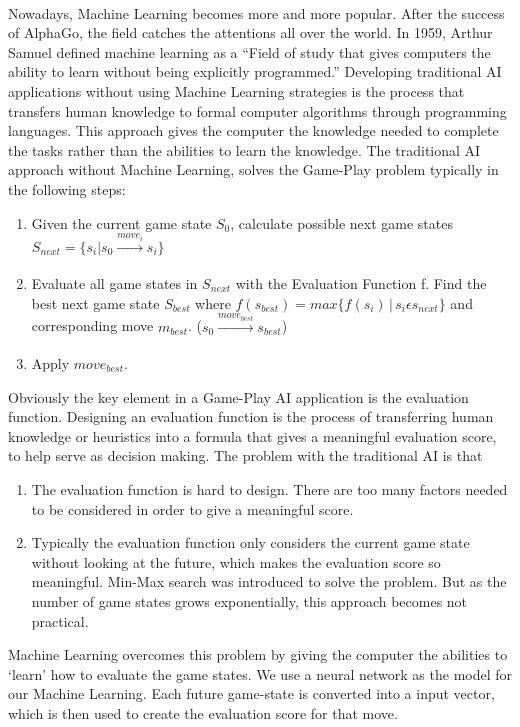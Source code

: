 \documentclass{report}
\begin{document}
	\\
		Nowadays, Machine Learning becomes more and more popular. After the success of AlphaGo, the field catches the attentions all over the world.  In 1959, Arthur Samuel defined machine
		learning as a ``Field of study that gives computers the ability to learn without being explicitly programmed.'' Developing traditional AI applications without using Machine Learning
		strategies is the process that transfers human knowledge to formal computer algorithms through programming languages. This approach gives the computer the knowledge needed
		to complete the tasks rather than the abilities to learn the knowledge. The traditional AI approach without Machine Learning, solves the Game-Play problem typically in the following steps:
		\begin{enumerate}
			\item Given the current game state $S_0$, calculate possible next game states $S_{next} = \{s_i|s_0\xrightarrow[]{move_i}s_i\}$

			\item Evaluate all game states in $S_{next}$ with the Evaluation Function f. Find the best next game state $S_{best}$ where $f(s_{best}) = max\{f(s_i)\,|\,s_i \epsilon s_{next}\}$ and corresponding
				move $m_{best}$. ($s_0 \xrightarrow[]{move_{best}} s_{best}$)
			\item Apply $move_{best}$.
		\end{enumerate}
		Obviously the key element in a Game-Play AI application is the evaluation function. Designing an evaluation function is the process of transferring human knowledge or heuristics into a formula
		that gives a meaningful evaluation score, to help serve as decision making. The problem with the traditional AI is that
		\begin{enumerate}
			\item The evaluation function is hard to design. There are too many factors needed to be considered in order to give a meaningful score. 
			\item Typically the evaluation function only considers the current game state without looking at the future, which makes the evaluation score so meaningful.  Min-Max search was
				introduced to solve the problem. But as the number of game states grows exponentially, this approach becomes not practical.
		\end{enumerate}
		Machine Learning overcomes this problem by giving the computer the abilities to `learn' how to evaluate the game states. We use a neural network as the model for our Machine Learning. Each
		future game-state is converted into a input vector, which is then used to create the evaluation score for that move.\\
\end{document}
